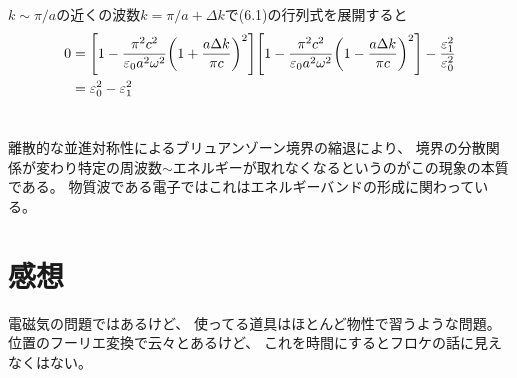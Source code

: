 \documentclass[../../master.tex]{subfiles}
\begin{document}
\section{}
\(k\sim \pi/a\)の近くの波数\(k= \pi/a+\Delta k\)で(6.1)の行列式を展開すると
\begin{equation}\begin{aligned}[b]
    0&=\qty[1-\frac{\pi^2c^2}{\varepsilon_0a^2\omega^2}\qty(1+\frac{a \Delta k}{\pi c})^2]
    \qty[1-\frac{\pi^2c^2}{\varepsilon_0a^2\omega^2}\qty(1-\frac{a \Delta k}{\pi c})^2]
    -\frac{\varepsilon_1^2}{\varepsilon_0^2}\\
    &= \varepsilon_0^2 -\varepsilon_1^2
\end{aligned}\end{equation}

\section{}
離散的な並進対称性によるブリュアンゾーン境界の縮退により、
境界の分散関係が変わり特定の周波数\(\sim\)エネルギーが取れなくなるというのがこの現象の本質である。
物質波である電子ではこれはエネルギーバンドの形成に関わっている。


\section*{感想}
電磁気の問題ではあるけど、
使ってる道具はほとんど物性で習うような問題。
位置のフーリエ変換で云々とあるけど、
これを時間にするとフロケの話に見えなくはない。
\end{document}
